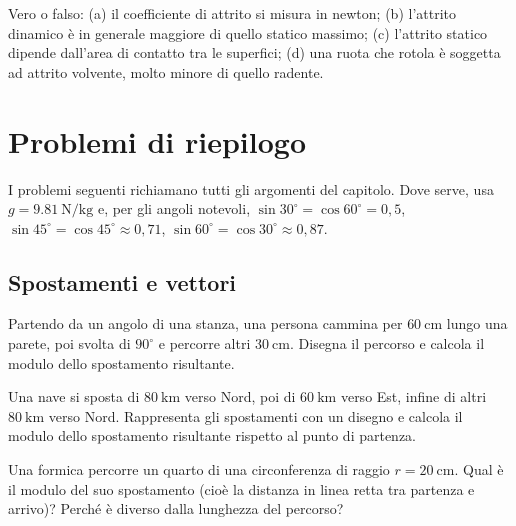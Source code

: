 \begin{esercizio}
Vero o falso: (a) il coefficiente di attrito si misura in newton; (b) l'attrito dinamico è in generale maggiore di quello statico massimo; (c) l'attrito statico dipende dall'area di contatto tra le superfici; (d) una ruota che rotola è soggetta ad attrito volvente, molto minore di quello radente.\\
\end{esercizio}


\section{Problemi di riepilogo}

I problemi seguenti richiamano tutti gli argomenti del capitolo. Dove serve, usa $g = \SI{9,81}{\newton\per\kilo\gram}$ e, per gli angoli notevoli, $\sin 30^\circ = \cos 60^\circ = 0,5$, $\sin 45^\circ = \cos 45^\circ \approx 0,71$, $\sin 60^\circ = \cos 30^\circ \approx 0,87$.

\subsection*{Spostamenti e vettori}

\begin{esercizio}
Partendo da un angolo di una stanza, una persona cammina per $\SI{60}{\centi\meter}$ lungo una parete, poi svolta di $90^\circ$ e percorre altri $\SI{30}{\centi\meter}$. Disegna il percorso e calcola il modulo dello spostamento risultante.\\
\end{esercizio}

\begin{esercizio}
Una nave si sposta di $\SI{80}{\kilo\meter}$ verso Nord, poi di $\SI{60}{\kilo\meter}$ verso Est, infine di altri $\SI{80}{\kilo\meter}$ verso Nord. Rappresenta gli spostamenti con un disegno e calcola il modulo dello spostamento risultante rispetto al punto di partenza.\\
\end{esercizio}

\begin{esercizio}
Una formica percorre un quarto di una circonferenza di raggio $r = \SI{20}{\centi\meter}$. Qual è il modulo del suo spostamento (cioè la distanza in linea retta tra partenza e arrivo)? Perché è diverso dalla lunghezza del percorso?\\
\end{esercizio}

